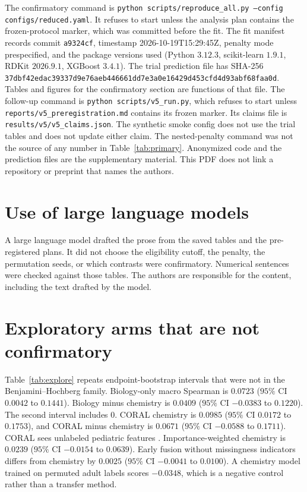 \documentclass[10pt]{article}
\begin{document}
The confirmatory command is \texttt{python scripts/reproduce\_all.py --config configs/reduced.yaml}.
It refuses to start unless the analysis plan contains the frozen-protocol marker, which was committed before the fit.
The fit manifest records commit \texttt{a9324cf}, timestamp 2026-10-19T15:29:45Z, penalty mode prespecified, and the package versions used (Python $3.12.3$, scikit-learn $1.9.1$, RDKit $2026.9.1$, XGBoost $3.4.1$).
The trial prediction file has SHA-256 \texttt{37dbf42edac39337d9e76aeb446661dd7e3a0e16429d453cfd4d93abf68faa0d}.
Tables and figures for the confirmatory section are functions of that file.
The follow-up command is \texttt{python scripts/v5\_run.py}, which refuses to start unless \texttt{reports/v5\_preregistration.md} contains its frozen marker.
Its claims file is \texttt{results/v5/v5\_claims.json}.
The synthetic smoke config does not use the trial tables and does not update either claim.
The nested-penalty command was not the source of any number in Table~\ref{tab:primary}.
Anonymized code and the prediction files are the supplementary material.
This PDF does not link a repository or preprint that names the authors.

\section*{Use of large language models}

A large language model drafted the prose from the saved tables and the pre-registered plans.
It did not choose the eligibility cutoff, the penalty, the permutation seeds, or which contrasts were confirmatory.
Numerical sentences were checked against those tables.
The authors are responsible for the content, including the text drafted by the model.




\appendix

\section{Exploratory arms that are not confirmatory}
\label{app:explore}

Table~\ref{tab:explore} repeats endpoint-bootstrap intervals that were not in the Benjamini--Hochberg family.
Biology-only macro Spearman is $0.0723$ ($95\%$ CI $0.0042$ to $0.1441$).
Biology minus chemistry is $0.0409$ ($95\%$ CI $-0.0383$ to $0.1220$).
The second interval includes $0$.
CORAL chemistry is $0.0985$ ($95\%$ CI $0.0172$ to $0.1753$), and CORAL minus chemistry is $0.0671$ ($95\%$ CI $-0.0588$ to $0.1711$).
CORAL sees unlabeled pediatric features \citep{sun2016coral}.
Importance-weighted chemistry is $0.0239$ ($95\%$ CI $-0.0154$ to $0.0639$).
Early fusion without missingness indicators differs from chemistry by $0.0025$ ($95\%$ CI $-0.0041$ to $0.0100$).
A chemistry model trained on permuted adult labels scores $-0.0348$, which is a negative control rather than a transfer method.
\end{document}
